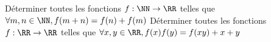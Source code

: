 %
%
	\begin{tasks}
		\task Déterminer toutes les fonctions $f : \NN \rightarrow \RR$ telles que $\forall m,n \in \NN, f(m+n) = f(n)+ f(m)$
		\task Déterminer toutes les fonctions $f : \RR \rightarrow \RR$ telles que $\forall x,y \in \RR, f(x)f(y) = f(xy)+ x +y$
	\end{tasks}
